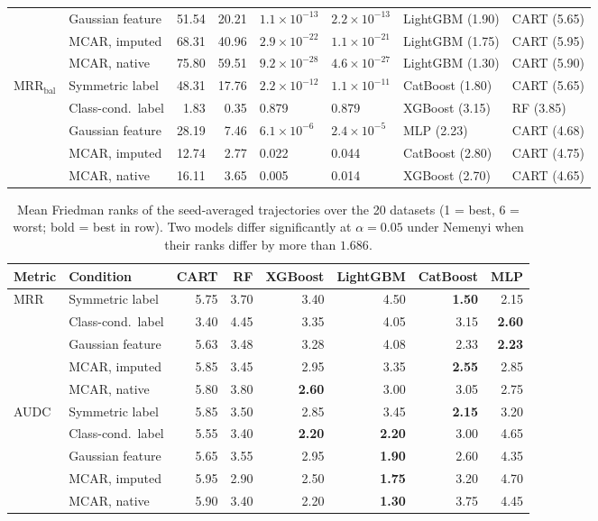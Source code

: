 \documentclass[pdflatex,sn-mathphys]{sn-jnl}
\theoremstyle{thmstyleone}
\begin{document}
\begin{table}[t]
\begin{tabular}{@{}llrrllll@{}}
 & Gaussian feature & 51.54 & 20.21 & $1.1\times10^{-13}$ & $2.2\times10^{-13}$ & LightGBM (1.90) & CART (5.65) \\
 & MCAR, imputed & 68.31 & 40.96 & $2.9\times10^{-22}$ & $1.1\times10^{-21}$ & LightGBM (1.75) & CART (5.95) \\
 & MCAR, native & 75.80 & 59.51 & $9.2\times10^{-28}$ & $4.6\times10^{-27}$ & LightGBM (1.30) & CART (5.90) \\
\midrule
MRR$_{\mathrm{bal}}$ & Symmetric label & 48.31 & 17.76 & $2.2\times10^{-12}$ & $1.1\times10^{-11}$ & CatBoost (1.80) & CART (5.65) \\
 & Class-cond.\ label & 1.83 & 0.35 & 0.879 & 0.879 & XGBoost (3.15) & RF (3.85) \\
 & Gaussian feature & 28.19 & 7.46 & $6.1\times10^{-6}$ & $2.4\times10^{-5}$ & MLP (2.23) & CART (4.68) \\
 & MCAR, imputed & 12.74 & 2.77 & 0.022 & 0.044 & CatBoost (2.80) & CART (4.75) \\
 & MCAR, native & 16.11 & 3.65 & 0.005 & 0.014 & XGBoost (2.70) & CART (4.65) \\
\bottomrule
\end{tabular}
\end{table}
\begin{table}[t]
\centering
\footnotesize
\setlength{\tabcolsep}{4pt}
\caption{Mean Friedman ranks of the seed-averaged trajectories over the 20 datasets (1 = best, 6 = worst; bold = best in row). Two models differ significantly at $\alpha=0.05$ under Nemenyi when their ranks differ by more than $1.686$.}
\label{tab:ranks}
\begin{tabular*}{\textwidth}{@{\extracolsep{\fill}}llrrrrrr@{}}
\toprule
Metric & Condition & CART & RF & XGBoost & LightGBM & CatBoost & MLP \\
\midrule
MRR & Symmetric label & 5.75 & 3.70 & 3.40 & 4.50 & \textbf{1.50} & 2.15 \\
 & Class-cond.\ label & 3.40 & 4.45 & 3.35 & 4.05 & 3.15 & \textbf{2.60} \\
 & Gaussian feature & 5.63 & 3.48 & 3.28 & 4.08 & 2.33 & \textbf{2.23} \\
 & MCAR, imputed & 5.85 & 3.45 & 2.95 & 3.35 & \textbf{2.55} & 2.85 \\
 & MCAR, native & 5.80 & 3.80 & \textbf{2.60} & 3.00 & 3.05 & 2.75 \\
\midrule
AUDC & Symmetric label & 5.85 & 3.50 & 2.85 & 3.45 & \textbf{2.15} & 3.20 \\
 & Class-cond.\ label & 5.55 & 3.40 & \textbf{2.20} & \textbf{2.20} & 3.00 & 4.65 \\
 & Gaussian feature & 5.65 & 3.55 & 2.95 & \textbf{1.90} & 2.60 & 4.35 \\
 & MCAR, imputed & 5.95 & 2.90 & 2.50 & \textbf{1.75} & 3.20 & 4.70 \\
 & MCAR, native & 5.90 & 3.40 & 2.20 & \textbf{1.30} & 3.75 & 4.45 \\
\bottomrule
\end{tabular*}
\end{table}
\end{document}

